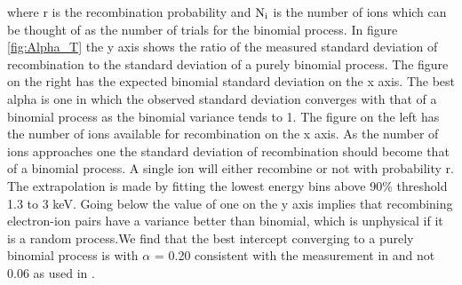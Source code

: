 \noindent where r is the recombination probability and $\rm N_i$ is the number of ions which can be thought of as the number of trials for the binomial process. In figure \ref{fig:Alpha_T} the y axis shows the ratio of the measured standard deviation of recombination to the standard deviation of a purely binomial process. The figure on the right has the expected binomial standard deviation on the x axis. The best alpha is one in which the observed standard deviation converges with that of a binomial process as the binomial variance tends to 1. The figure on the left has the number of ions available for recombination on the x axis. As the number of ions approaches one the standard deviation of recombination should become that of a binomial process. A single ion will either recombine or not with probability r.  The extrapolation is made by fitting the lowest energy bins above 90\% threshold 1.3 to 3 keV. Going below the value of one on the y axis implies that recombining electron-ion pairs have a variance better than binomial, which is unphysical if it is a random process.We find that the best intercept converging to a purely binomial process is with $\alpha$ = 0.20 consistent with the measurement in \cite{Doke_alpha} and not 0.06 as used in \cite{Dahl_Thesis}.

